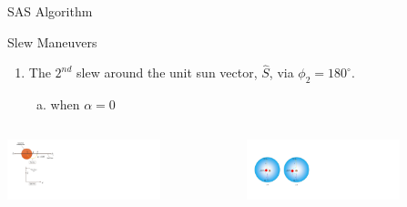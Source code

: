\documentclass{beamer}
\begin{document}
\begin{frame}{SAS Algorithm}
\begin{block}{Slew Maneuvers}
\begin{enumerate}[II]
\item The $2^{nd}$ slew around the unit sun vector, $\hat{S}$, via $\phi_2=180^{\circ}$.
\begin{enumerate}[b)]
\item when $\alpha=0$
\end{enumerate}
\end{enumerate}

\begin{columns}
	\begin{column}{0.5\textwidth}
		\begin{center}
			\includegraphics[width=1.75in]{./Figures/SVAS_3r_modified}
		\end{center}
	\end{column}
	\begin{column}{0.5\textwidth}  %
		\begin{center}
			\includegraphics[width=1.75in]{./Figures/SASSchematic3_alpha0}
		\end{center}
	\end{column}
\end{columns}




\end{block}
\end{frame}
\end{document}
